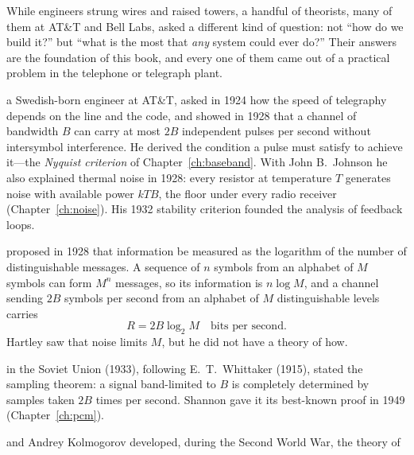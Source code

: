 While engineers strung wires and raised towers, a handful of theorists, many of them at AT\&T and Bell
Labs, asked a different kind of question: not ``how do we build it?'' but ``what is the most that
\emph{any} system could ever do?'' Their answers are the foundation of this book, and every one of
them came out of a practical problem in the telephone or telegraph plant.



\begin{description}[leftmargin=0pt,itemsep=4pt]
\item[Harry Nyquist,] a Swedish-born engineer at AT\&T, asked in 1924 how the speed of telegraphy
depends on the line and the code, and showed in 1928 that a channel of bandwidth $B$ can carry at
most $2B$ independent pulses per second without intersymbol interference. He derived the condition a
pulse must satisfy to achieve it---the \emph{Nyquist criterion} of Chapter~\ref{ch:baseband}. With John
B.~Johnson he also explained thermal noise in 1928: every resistor at temperature $T$ generates noise
with available power $kTB$, the floor under every radio receiver (Chapter~\ref{ch:noise}). His 1932
stability criterion founded the analysis of feedback loops.
\item[Ralph Hartley] proposed in 1928 that information be measured as the logarithm of the number of
distinguishable messages. A sequence of $n$ symbols from an alphabet of $M$ symbols can form $M^n$
messages, so its information is $n\log M$, and a channel sending $2B$ symbols per second from an
alphabet of $M$ distinguishable levels carries
\begin{equation}
R = 2B\log_2 M\quad\text{bits per second}.
\label{eq:ch01:hartley}
\end{equation}
Hartley saw that noise limits $M$, but he did not have a theory of how.
\item[Vladimir Kotelnikov] in the Soviet Union (1933), following E.~T.~Whittaker (1915), stated the
sampling theorem: a signal band-limited to $B$ is completely determined by samples taken $2B$ times
per second. Shannon gave it its best-known proof in 1949 (Chapter~\ref{ch:pcm}).
\item[Norbert Wiener] and Andrey Kolmogorov developed, during the Second World War, the theory of

\end{description}
